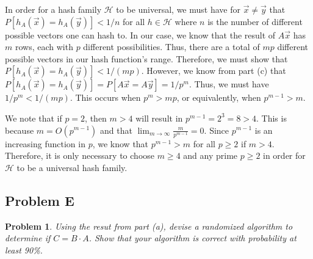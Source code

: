 \documentclass[psamsfonts]{amsart}
\newtheorem{prob}{Problem}[section]
\newenvironment{sol}{{\bfseries Solution}}{\qedsymbol}
\theoremstyle{definition}
\theoremstyle{remark}
\numberwithin{equation}{section}
\begin{document}
\begin{sol}
In order for a hash family $\mathcal{H}$ to be universal, we must have for $\vec{x} \neq \vec{y}$ that $P[h_A(\vec{x}) = h_A(\vec{y})] < 1/n$ for all $h \in \mathcal{H}$ where $n$ is the number of different possible vectors one can hash to. In our case, we know that the result of $A\vec{x}$ has $m$ rows, each with $p$ different possibilities. Thus, there are a total of $mp$ different possible vectors in our hash function's range. Therefore, we must show that $P[h_A(\vec{x}) = h_A(\vec{y})] < 1/(mp)$. However, we know from part (c) that $P[h_A(\vec{x}) = h_A(\vec{y})] = P[A \vec{x} = A \vec{y} ] = 1/p^m$. Thus, we must have $1/p^m < 1/(mp)$. This occurs when $p^m > mp$, or equivalently, when $p^{m-1} > m$.  

We note that if $p =2$, then $m > 4$ will result in $p^{m-1} = 2^3 = 8 > 4$. This is because $m = O(p^{m-1})$ and that $\lim_{m \to \infty} \frac{m}{p^{m-1}} = 0$. Since $p^{m-1}$ is an increasing function in $p$, we know that $p^{m-1} > m$ for all $p \geq 2$ if $m > 4$. Therefore, it is only necessary to choose $m \geq 4$ and any prime $p \geq 2$ in order for $\mathcal{H}$ to be a universal hash family.
\end{sol}

\subsection{Problem E}

\begin{prob}
Using the resut from part (a), devise a randomized algorithm to determine if $C = B \cdot A$. Show that your algorithm is correct with probability at least 90\%.
\end{prob}
\end{document}
